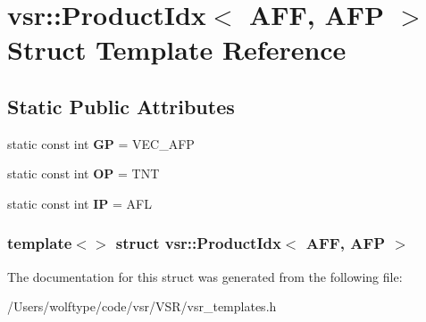 \hypertarget{structvsr_1_1_product_idx_3_01_a_f_f_00_01_a_f_p_01_4}{\section{vsr\-:\-:Product\-Idx$<$ A\-F\-F, A\-F\-P $>$ Struct Template Reference}
\label{structvsr_1_1_product_idx_3_01_a_f_f_00_01_a_f_p_01_4}
}
\subsection*{Static Public Attributes}
\begin{DoxyCompactItemize}
\item 
\hypertarget{structvsr_1_1_product_idx_3_01_a_f_f_00_01_a_f_p_01_4_afd3768bb8367d87419f899fb52a8f220}{static const int {\bfseries G\-P} = V\-E\-C\-\_\-\-A\-F\-P}\label{structvsr_1_1_product_idx_3_01_a_f_f_00_01_a_f_p_01_4_afd3768bb8367d87419f899fb52a8f220}

\item 
\hypertarget{structvsr_1_1_product_idx_3_01_a_f_f_00_01_a_f_p_01_4_a5c06244a9b09d6a15ff1619d09c85a5d}{static const int {\bfseries O\-P} = T\-N\-T}\label{structvsr_1_1_product_idx_3_01_a_f_f_00_01_a_f_p_01_4_a5c06244a9b09d6a15ff1619d09c85a5d}

\item 
\hypertarget{structvsr_1_1_product_idx_3_01_a_f_f_00_01_a_f_p_01_4_ad9a972e2583146ba7ab4f104c0ef5c5d}{static const int {\bfseries I\-P} = A\-F\-L}\label{structvsr_1_1_product_idx_3_01_a_f_f_00_01_a_f_p_01_4_ad9a972e2583146ba7ab4f104c0ef5c5d}

\end{DoxyCompactItemize}
\subsubsection*{template$<$$>$ struct vsr\-::\-Product\-Idx$<$ A\-F\-F, A\-F\-P $>$}



The documentation for this struct was generated from the following file\-:\begin{DoxyCompactItemize}
\item 
/\-Users/wolftype/code/vsr/\-V\-S\-R/vsr\-\_\-templates.\-h\end{DoxyCompactItemize}

